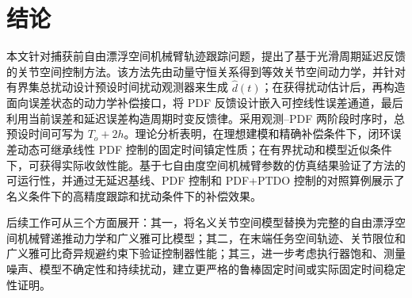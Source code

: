 \section{结论}

本文针对捕获前自由漂浮空间机械臂轨迹跟踪问题，提出了基于光滑周期延迟反馈的关节空间控制方法。该方法先由动量守恒关系得到等效关节空间动力学，并针对有界集总扰动设计预设时间扰动观测器来生成 \(\hat d(t)\)；在获得扰动估计后，再构造面向误差状态的动力学补偿接口，将 PDF 反馈设计嵌入可控线性误差通道，最后利用当前误差和延迟误差构造周期时变反馈律。采用观测--PDF 两阶段时序时，总预设时间可写为 \(T_o+2h\)。理论分析表明，在理想建模和精确补偿条件下，闭环误差动态可继承线性 PDF 控制的固定时间镇定性质；在有界扰动和模型近似条件下，可获得实际收敛性能。基于七自由度空间机械臂参数的仿真结果验证了方法的可运行性，并通过无延迟基线、PDF 控制和 PDF+PTDO 控制的对照算例展示了名义条件下的高精度跟踪和扰动条件下的补偿效果。

后续工作可从三个方面展开：其一，将名义关节空间模型替换为完整的自由漂浮空间机械臂递推动力学和广义雅可比模型；其二，在末端任务空间轨迹、关节限位和广义雅可比奇异规避约束下验证控制器性能；其三，进一步考虑执行器饱和、测量噪声、模型不确定性和持续扰动，建立更严格的鲁棒固定时间或实际固定时间稳定性证明。
